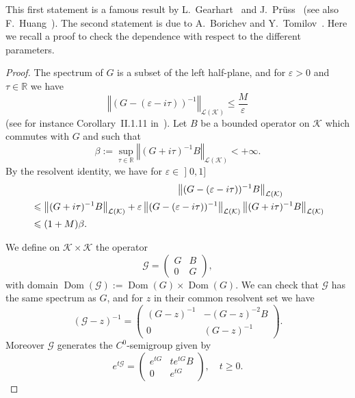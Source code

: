 \documentclass[11pt]{article}
\theoremstyle{definition}
\numberwithin{equation}{section}
\numberwithin{figure}{section}
\numberwithin{table}{section}
\newcommand{\nr}[1]{\left\Vert #1\right\Vert}
\renewcommand{\leq}{\leqslant}
\renewcommand{\geq}{\geqslant}
\newcommand{\inv}{^{-1}}
\newcommand{\1}{\mathds 1}
\DeclareMathOperator{\Dom}{Dom}
\newcommand{\R}{\mathbb{R}}
\renewcommand{\b}{\beta}
\newcommand{\e}{\varepsilon}
\renewcommand{\t}{\tau}
\newcommand{\Gc}{{\mathcal G}}
\newcommand{\Kc}{{\mathcal K}}
\newcommand{\Lc}{{\mathcal L}}
\newcommand{\stepp}{\noindent {\bf $\bullet$}\quad }
\begin{document}
This first statement is a famous result by L.~Gearhart~\cite{Gearhart78} and J.~Pr\"uss~\cite{Pruss84} (see also F.~Huang~\cite{Huang85}). The second statement is due to A.~Borichev and Y.~Tomilov~\cite{BorichevTo10}. Here we recall a proof to check the dependence with respect to the different parameters.

\begin{proof}
The spectrum of $G$ is a subset of the left half-plane, and for $\e > 0$ and $\t \in \R$ we have
\begin{equation}\label{estim-res-G}
\nr{(G-(\e-i\t))\inv}_{\Lc(\Kc)} \leq \frac M \e
\end{equation}
(see for instance Corollary~II.1.11 in~\cite{engel}). Let $B$ be a bounded operator on $\Kc$ which commutes with $G$ and such that
\[
\b := \sup_{\t \in \R} \nr{(G+i\t)^{-1} B}_{\Lc(\Kc)} < +\infty.
\]
By the resolvent identity, we have for $\e \in\mathopen{]}0,1]$
\begin{multline}\label{estim-resG-B}
\lefteqn{\nr{(G-(\e-i\t))\inv B}_{\Lc(\Kc)}}\\
\begin{aligned}
& \leq \nr{(G+i\t)\inv B}_{\Lc(\Kc)} + \e \nr{(G-(\e-i\t))\inv}_{\Lc(\Kc)}\nr{(G+i\t)\inv B}_{\Lc(\Kc)}\\
& \leq (1+M)\b.
\end{aligned}
\end{multline}

We define on $\Kc \times \Kc$ the operator
\[
\Gc =
\begin{pmatrix}
G & B \\
0 & G
\end{pmatrix},
\]
with domain $\Dom(\Gc) := \Dom(G) \times \Dom(G)$. We can check that $\Gc$ has the same spectrum as $G$, and for $z$ in their common resolvent set we have
\[
(\Gc - z)\inv =
\begin{pmatrix}
(G-z)\inv & -(G-z)^{-2} B \\
0 & (G-z)\inv
\end{pmatrix}.
\]
Moreover $\Gc$ generates the $C^0$-semigroup given by
\[
e^{t\Gc} =
\begin{pmatrix}
e^{tG} & t e^{tG} B \\
0 & e^{tG}
\end{pmatrix}, \quad t \geq 0.
\]


\end{proof}
\end{document}
